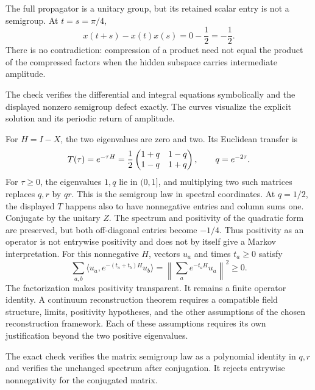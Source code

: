 The full propagator is a unitary group, but its retained scalar entry is not a semigroup. At $t=s=\pi/4$,
\[
x(t+s)-x(t)x(s)=0-\frac12=-\frac12.
\]
There is no contradiction: compression of a product need not equal the product of the compressed factors when the hidden subspace carries intermediate amplitude.

The check verifies the differential and integral equations symbolically and the displayed nonzero semigroup defect exactly. The curves visualize the explicit solution and its periodic return of amplitude.

For $H=I-X$, the two eigenvalues are zero and two. Its Euclidean transfer is
\[
T(\tau)=e^{-\tau H}
=\frac12\begin{pmatrix}1+q&1-q\\1-q&1+q\end{pmatrix},\qquad q=e^{-2\tau}.
\]
For $\tau\ge0$, the eigenvalues $1,q$ lie in $(0,1]$, and multiplying two such matrices replaces $q,r$ by $qr$. This is the semigroup law in spectral coordinates.
At $q=1/2$, the displayed $T$ happens also to have nonnegative entries and column sums one. Conjugate by the unitary $Z$. The spectrum and positivity of the quadratic form are preserved, but both off-diagonal entries become $-1/4$. Thus positivity as an operator is not entrywise positivity and does not by itself give a Markov interpretation.
For this nonnegative $H$, vectors $u_a$ and times $t_a\ge0$ satisfy
\[
\sum_{a,b}\langle u_a,e^{-(t_a+t_b)H}u_b\rangle
=\left\|\sum_a e^{-t_aH}u_a\right\|^2\ge0.
\]
The factorization makes positivity transparent. It remains a finite operator identity. A continuum reconstruction theorem requires a compatible field structure, limits, positivity hypotheses, and the other assumptions of the chosen reconstruction framework. Each of these assumptions requires its own justification beyond the two positive eigenvalues.

The exact check verifies the matrix semigroup law as a polynomial identity in $q,r$ and verifies the unchanged spectrum after conjugation. It rejects entrywise nonnegativity for the conjugated matrix.

